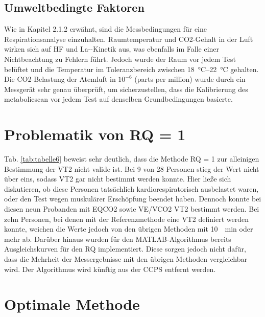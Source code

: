 \subsection{Umweltbedingte Faktoren}

Wie in Kapitel 2.1.2 erwähnt, sind die Messbedingungen für eine Respirationsanalyse einzuhalten. Raumtemperatur und \acs{CO2}-Gehalt in der Luft wirken sich auf \acs{HF} und \acs{La-}-Kinetik aus, was ebenfalls im Falle einer Nichtbeachtung zu Fehlern führt. Jedoch wurde der Raum vor jedem Test belüftet und die Temperatur im Toleranzbereich zwischen \SIrange{18}{22}{\degreeCelsius} gehalten. Die \acs{CO2}-Belastung der Atemluft in $10^{-6}$ (parts per million) wurde durch ein Messgerät sehr genau überprüft, um sicherzustellen, dass die Kalibrierung des metabolicscan vor jedem Test auf denselben Grundbedingungen basierte.

\section{Problematik von RQ = 1}

Tab. \ref{tab:tabelle6} beweist sehr deutlich, dass die Methode RQ = 1 zur alleinigen Bestimmung der VT2 nicht valide ist. Bei 9 von 28 Personen stieg der Wert nicht über eins, sodass VT2 gar nicht bestimmt werden konnte. Hier ließe sich diskutieren, ob diese Personen tatsächlich kardiorespiratorisch ausbelastet waren, oder den Test wegen muskulärer Erschöpfung beendet haben. Dennoch konnte bei diesen neun Probanden mit \acs{EQCO2} sowie \acs{VE}/\acs{VCO2} VT2 bestimmt werden. Bei zehn Personen, bei denen mit der Referenzmethode eine VT2 definiert werden konnte, weichen die Werte jedoch von den übrigen Methoden mit \SI{10}{\per\minute} oder mehr ab. Darüber hinaus wurden für den MATLAB-Algorithmus bereits Ausgleichskurven für den RQ implementiert. Diese sorgen jedoch nicht dafür, dass die Mehrheit der Messergebnisse mit den übrigen Methoden vergleichbar wird. Der Algorithmus wird künftig aus der \acs{CCPS} entfernt werden.

\section{Optimale Methode}

